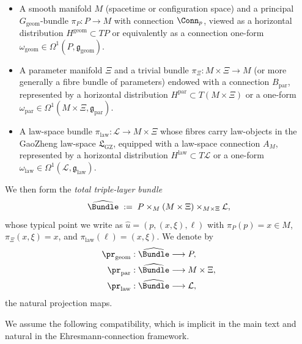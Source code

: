 \documentclass[11pt]{book}
\theoremstyle{plain}
\theoremstyle{definition}
\newcommand{\GZLS}{\ensuremath{\mathfrak{L}_{\mathrm{GZ}}}}       \newcommand{\GZLT}{\ensuremath{M_{!w}}}                           \newcommand{\GZLOC}{\ensuremath{A_M}}                             \newcommand{\GZLCurv}{\ensuremath{\mathcal{F}_{\mathrm{law}}}}
\begin{document}
\begin{itemize}
  \item A smooth manifold \(M\) (spacetime or configuration space) and
        a principal \(G_{\mathrm{geom}}\)-bundle
        \(\pi_P : P\to M\) with connection
        \(\Conn_p\), viewed as a horizontal distribution
        \(H^{\mathrm{geom}}\subset TP\) or equivalently as a connection
        one-form
        \(\omega_{\mathrm{geom}}\in\Omega^1(P,\mathfrak{g}_{\mathrm{geom}})\).
  \item A parameter manifold \(\Xi\) and a trivial bundle
        \(\pi_{\Xi}: M\times\Xi\to M\) (or more generally a fibre
        bundle of parameters) endowed with a connection
        \(B_{\mathrm{par}}\), represented by a horizontal distribution
        \(H^{\mathrm{par}}\subset T(M\times\Xi)\) or a one-form
        \(\omega_{\mathrm{par}}\in\Omega^1(M\times\Xi,\mathfrak{g}_{\mathrm{par}})\).
  \item A law-space bundle
        \(\pi_{\mathrm{law}}:\mathcal{L}\to M\times\Xi\) whose fibres
        carry law-objects in the GaoZheng law-space \(\GZLS\), equipped
        with a law-space connection \(\GZLOC\), represented by a
        horizontal distribution
        \(H^{\mathrm{law}}\subset T\mathcal{L}\) or a one-form
        \(\omega_{\mathrm{law}}\in\Omega^1(\mathcal{L},
        \mathfrak{g}_{\mathrm{law}})\).
\end{itemize}

We then form the \emph{total triple-layer bundle}
\[
  \widehat{\Bundle}
  \;:=\;
  P \times_M (M\times\Xi) \times_{M\times\Xi} \mathcal{L},
\]
whose typical point we write as
\(\widehat{u}=(p, (x,\xi), \ell)\) with
\(\pi_P(p)=x\in M\), \(\pi_{\Xi}(x,\xi)=x\), and
\(\pi_{\mathrm{law}}(\ell)=(x,\xi)\).  We denote by
\begin{align*}
  \pr_{\mathrm{geom}} &: \widehat{\Bundle} \longrightarrow P, \\
  \pr_{\mathrm{par}}  &: \widehat{\Bundle} \longrightarrow M\times\Xi, \\
  \pr_{\mathrm{law}}  &: \widehat{\Bundle} \longrightarrow \mathcal{L},
\end{align*}
the natural projection maps.



We assume the following compatibility, which is implicit in the main
text and natural in the Ehresmann-connection framework.
\end{document}

